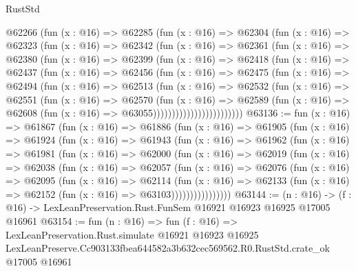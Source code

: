 \begin{lexlean}{RustStd}
\begin{coremodule}
            @62266
              (fun (x : @16) =>
              @62285
                (fun (x : @16) =>
                @62304
                  (fun (x : @16) =>
                  @62323
                    (fun (x : @16) =>
                    @62342
                      (fun (x : @16) =>
                      @62361
                        (fun (x : @16) =>
                        @62380
                          (fun (x : @16) =>
                          @62399
                            (fun (x : @16) =>
                            @62418
                              (fun (x : @16) =>
                              @62437
                                (fun (x : @16) =>
                                @62456
                                  (fun (x : @16) =>
                                  @62475
                                    (fun (x : @16) =>
                                    @62494
                                      (fun (x : @16) =>
                                      @62513
                                        (fun (x : @16) =>
                                        @62532
                                          (fun (x : @16) =>
                                          @62551
                                            (fun (x : @16) =>
                                            @62570
                                              (fun (x : @16) =>
                                              @62589
                                                (fun (x : @16) =>
                                                @62608
                                                  (fun (x : @16) => @63055))))))))))))))))))))))))
@63136 := fun (x : @16) =>
  @61867
    (fun (x : @16) =>
    @61886
      (fun (x : @16) =>
      @61905
        (fun (x : @16) =>
        @61924
          (fun (x : @16) =>
          @61943
            (fun (x : @16) =>
            @61962
              (fun (x : @16) =>
              @61981
                (fun (x : @16) =>
                @62000
                  (fun (x : @16) =>
                  @62019
                    (fun (x : @16) =>
                    @62038
                      (fun (x : @16) =>
                      @62057
                        (fun (x : @16) =>
                        @62076
                          (fun (x : @16) =>
                          @62095
                            (fun (x : @16) =>
                            @62114
                              (fun (x : @16) =>
                              @62133
                                (fun (x : @16) => @62152 (fun (x : @16) => @63103))))))))))))))))
@63144 := (n : @16) ->
  (f : @16) -> LexLeanPreservation.Rust.FunSem @16921 @16923 @16925 @17005 @16961
@63154 := fun (n : @16) =>
  fun (f : @16) =>
  LexLeanPreservation.Rust.simulate
    @16921
    @16923
    @16925
    LexLeanPreserve.Cc903133fbea644582a3b632cec569562.R0.RustStd.crate_ok
    @17005
    @16961
\end{coremodule}
\end{lexlean}
